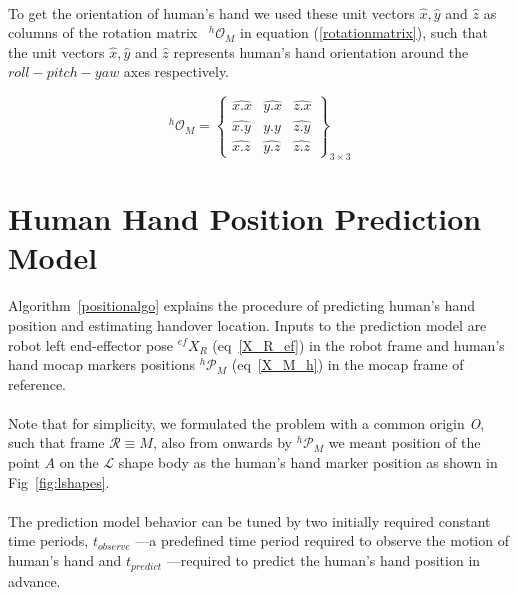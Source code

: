 \paragraph*{}
To get the orientation of human's hand we used these unit vectors $\hat{x}, \hat{y}$ and $\hat{z}$ as columns of the rotation matrix~\cite{evans2001rotations, altmann2005rotations, jia2017rotation} ${}^{h}\mathcal{O}_{M}$ in equation (\ref{rotationmatrix}), such that the unit vectors $\hat{x}, \hat{y}$ and $\hat{z}$ represents human's hand orientation around the $roll-pitch-yaw$ axes respectively.

\begin{equation}\label{rotationmatrix}
{}^{h}\mathcal{O}_{M} = 
\left\{\begin{array}{cccc}
\hat{x.x} & \hat{y.x} & \hat{z.x} \\
\hat{x.y} & \hat{y.y} & \hat{z.y} \\
\hat{x.z} & \hat{y.z} & \hat{z.z}
\end{array}\right\}_{3\times 3}
\end{equation}



\clearpage
\section{Human Hand Position Prediction Model}\label{prediction_model}
Algorithm~\ref{positionalgo} explains the procedure of predicting human's hand position and estimating handover location. Inputs to the prediction model are robot left end-effector pose $\mathcal{}^{ef}{X}_R$ (eq~\ref{X_R_ef}) in the robot frame and human's hand mocap markers positions ${}^{h}\mathcal{P}_M$ (eq~\ref{X_M_h}) in the mocap frame of reference.

\paragraph*{}
Note that for simplicity, we formulated the problem with a common origin {\it O}, such that frame $\mathcal R \equiv M$, also from onwards by ${}^{h}\mathcal{P}_M$ we meant position of the point $A$ on the $\mathcal{L}$ shape body as the human's hand marker position as shown in Fig~\ref{fig:lshapes}.


\paragraph*{}
The prediction model behavior can be tuned by two initially required constant time periods, $t_{observe}$ ---a predefined time period required to observe the motion of human's hand and $t_{predict}$ ---required to predict the human's hand position in advance.

